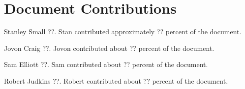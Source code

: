 \documentclass{article}
\begin{document}
\newpage
\section{Document Contributions}

Stanley Small ??. Stan contributed approximately ?? percent of the document.

Jovon Craig ??. Jovon contributed about ?? percent of the document.

Sam Elliott ??. Sam contributed about ?? percent of the document.

Robert Judkins ??. Robert contributed about ?? percent of the document.

\newpage




\newpage



\end{document}
